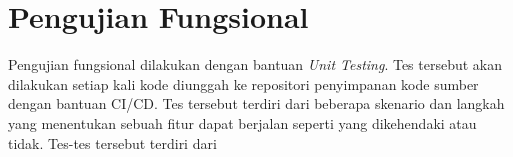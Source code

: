 
\section{Pengujian Fungsional}
Pengujian fungsional dilakukan dengan bantuan \textit{Unit Testing}. Tes tersebut akan dilakukan
setiap kali kode diunggah ke repositori penyimpanan kode sumber dengan bantuan CI/CD. Tes tersebut
terdiri dari beberapa skenario dan langkah yang menentukan sebuah fitur dapat berjalan seperti
yang dikehendaki atau tidak. Tes-tes tersebut terdiri dari